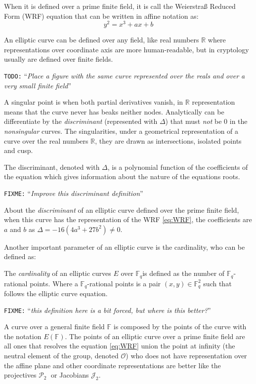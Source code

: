 \documentclass[10pt,a4paper,twoside]{llncs}
\newcommand{\todo}[1]{\texttt{\color{red}TODO:} ``\emph{#1}''}
\newcommand{\fixme}[1]{\texttt{\color{red}FIXME:} ``\emph{#1}''}
\newcommand{\Proy}{\ensuremath{\mathcal{P}_{2}}}%
\newcommand{\Jacob}{\ensuremath{\mathcal{J}_{2}}}%
\newcommand{\Fq}{\ensuremath{\mathbb{F}_q}}%
\newcommand{\PaI}{\ensuremath{\mathcal{O}}}%
\begin{document}
When it is defined over a prime finite field, it is call the Weierstra\ss{} Reduced Form (WRF) equation that can be written in affine notation as:
\begin{equation}\label{eq:WRF}
y^2=x^3+ax+b
\end{equation}

An elliptic curve can be defined over any field, like real numbers $\mathbb{R}$ where representations over coordinate axis are more human-readable, but in cryptology usually are defined over finite fields.

\todo{Place a figure with the same curve represented over the reals and over a very small finite field}

A singular point is when both partial derivatives vanish, in $\mathbb{R}$ representation means that the curve never has beaks neither nodes. Analytically can be differentiate by the \emph{discriminant} (represented with $\Delta$) that must \emph{not} be 0 in the \emph{nonsingular} curves. The singularities, under a geometrical representation of a curve over the real numbers $\mathbb{R}$, they are drawn as intersections, isolated points and cusp.

\begin{definition}\label{def:discriminant}
 The discriminant, denoted with $\Delta$, is a polynomial function of the coefficients of the equation which gives information about the nature of the equations roots.
\end{definition}
\fixme{Improve this discriminant definition}

About the \emph{discriminant} of an elliptic curve defined over the prime finite field, when this curve has the representation of the WRF \ref{eq:WRF}, the coefficients are $a$ and $b$ as $\Delta = -16(4a^3+27b^2)\ne 0$.

Another important parameter of an elliptic curve is the cardinality, who can be defined as:
\begin{definition}\label{def:cardinality}
 The \emph{cardinality} of an elliptic curves $E$ over \Fq is defined as the number of \Fq-rational points. Where a \Fq-rational points is a pair $(x,y)\in \mathbb{F}_{q}^{2}$ such that follows the elliptic curve equation.
\end{definition}
\fixme{this definition here is a bit forced, but where is this better?}

A curve over a general finite field $\mathbb{F}$ is composed by the points of the curve with the notation $E\left(\mathbb{F}\right)$. The points of an elliptic curve over a prime finite field are all ones that resolves the equation \ref{eq:WRF} union the point at infinity (the neutral element of the group, denoted \PaI) who does not have representation over the affine plane and other coordinate representations are better like the projectives \Proy $\;$ or Jacobians \Jacob.
\end{document}
